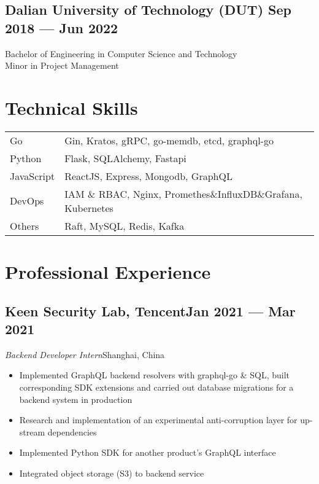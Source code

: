 \documentclass[a4,12pt]{article}
\newcommand{\subtext}[1]{
#1\par\vspace{-0.3cm}}
\newenvironment{zitemize}{
\begin{itemize}\itemsep0pt \parskip0pt \parsep1pt}
{\end{itemize}\vspace{-0.5cm}}
\begin{document}
\vspace{-0.3cm}
\subsection*{Dalian University of Technology (DUT) \hfill \textbf{Sep 2018 --- Jun 2022}}
Bachelor of Engineering in Computer Science and Technology\\
Minor in Project Management\\




\vspace{-0.4cm}

\section{\textbf{Technical Skills}}
\begin{tabular}{p{} p{}}
    Go & Gin, Kratos, gRPC, go-memdb, etcd, graphql-go \\
    Python & Flask, SQLAlchemy, Fastapi \\
    JavaScript & ReactJS, Express, Mongodb, GraphQL\\
    DevOps & IAM \& RBAC, Nginx, Promethes\&InfluxDB\&Grafana, Kubernetes\\
    Others & Raft, MySQL, Redis, Kafka\\
\end{tabular}

\section{\textbf{Professional Experience}}
        

\subsection*{Keen Security Lab, Tencent\hfill Jan 2021 --- Mar 2021} 
\subtext{\textit{Backend Developer Intern}\hfill Shanghai, China} 
    \begin{zitemize}
        \item Implemented GraphQL backend resolvers with graphql-go \& SQL, built corresponding SDK extensions and carried out database migrations for a backend system in production
        \item Research and implementation of an experimental anti-corruption layer for up-stream dependencies
        \item Implemented Python SDK for another product's GraphQL interface
        \item Integrated object storage (S3) to backend service
    \end{zitemize}
\end{document}
